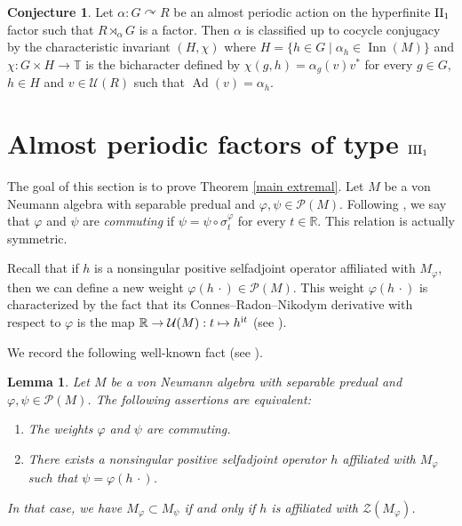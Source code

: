 \documentclass[a4paper,11pt]{amsart}
\numberwithin{equation}{section}
\newtheorem{lemma}[theorem]{Lemma}
\theoremstyle{definition}
\newtheorem*{conjecture}{Conjecture}
\newcommand{\R}{\mathbb{R}}
\newcommand{\T}{\mathbb{T}}
\newcommand{\cU}{\mathcal{U}}
\newcommand{\cP}{\mathcal{P}}
\newcommand{\Ad}{\operatorname{Ad}}
\newcommand{\ri}{\text{\rm i}}
\newcommand{\Inn}{\operatorname{Inn}}
\newcommand{\II}{{\rm II}}
\newcommand{\III}{{\rm III}}
\begin{document}
\begin{conjecture}
    Let $\alpha : G \curvearrowright R$ be an almost periodic action on the hyperfinite $\II_1$ factor such that $R \rtimes_\alpha G$ is a factor. Then $\alpha$ is classified up to cocycle conjugacy by the characteristic invariant $(H,\chi)$ where $H=\{h \in G \mid \alpha_h \in \Inn(M) \}$ and $\chi : G \times H \rightarrow \T$ is the bicharacter defined by $\chi(g,h)=\alpha_g(v)v^*$ for every $g \in G$, $h \in H$ and $v \in \cU(R)$ such that $\Ad(v)=\alpha_h$.
\end{conjecture}

\section{Almost periodic factors of type $\III_1$}

The goal of this section is to prove Theorem \ref{main extremal}. Let $M$ be a von Neumann algebra with separable predual and $\varphi, \psi \in \mathcal P(M)$. Following \cite[Chapter ${\rm VIII}$]{Ta03}, we say that $\varphi$ and $\psi$ are {\em commuting} if $\psi = \psi \circ \sigma_t^\varphi$ for every $t \in \R$. This relation is actually symmetric. 

Recall that if $h$ is a nonsingular positive selfadjoint operator affiliated with $M_\varphi$, then we can define a new weight $\varphi(h \, \cdot) \in \cP(M)$. This weight $\varphi(h \, \cdot)$ is characterized by the fact that its Connes--Radon--Nikodym derivative with respect to $\varphi$ is the map $\R \to \cU(M) : t \mapsto h^{\ri t}$ (see \cite[Lemma ${\rm VIII}$.2.8]{Ta03}).

We record the following well-known fact (see \cite[Corollary ${\rm VIII}$.3.6]{Ta03}).

\begin{lemma}\label{lem-commuting}
Let $M$ be a von Neumann algebra with separable predual and $\varphi, \psi \in \mathcal P(M)$. The following assertions are equivalent:
\begin{enumerate}
\item The weights $\varphi$ and $\psi$ are commuting.

\item There exists a nonsingular positive selfadjoint operator $h$ affiliated with $M_\varphi$ such that $\psi = \varphi(h \, \cdot)$.
\end{enumerate}
In that case, we have $M_\varphi \subset M_\psi$ if and only if $h$ is affiliated with $\mathcal Z(M_\varphi)$.
\end{lemma}
\end{document}
